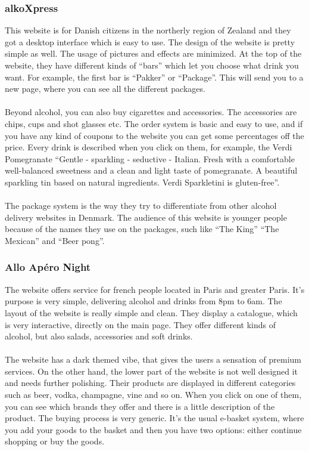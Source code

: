 \documentclass[12p]{article}
\begin{document}
\subsubsection{alkoXpress \cite{alkoXpress}}
This website is for Danish citizens in the northerly region of Zealand and they got a desktop interface which is easy to use. The design of the website is pretty simple as well. The usage of pictures and effects are minimized. At the top of the website, they have different kinds of “bars” which let you choose what drink you want. For example, the first bar is “Pakker” or “Package”. This will send you to a new page, where you can see all the different packages. 
\\ \\
Beyond alcohol, you can also buy cigarettes and accessories. The accessories are chips, cups and shot glasses etc. The order system is basic and easy to use, and if you have any kind of coupons to the website you can get some percentages off the price. 
Every drink is described when you click on them, for example, the Verdi Pomegranate 
“Gentle - sparkling - seductive - Italian.
Fresh with a comfortable well-balanced sweetness and a clean and light taste of pomegranate.
A beautiful sparkling tin based on natural ingredients.
Verdi Sparkletini is gluten-free”.
\\ \\
The package system is the way they try to differentiate from other alcohol delivery websites in Denmark. The audience of this website is younger people because of the names they use on the packages, such like “The King” “The Mexican” and “Beer pong”. 
\subsubsection{Allo Apéro Night \cite{alloAperoNight}}
The website offers service for french people located in Paris and greater Paris.
It’s purpose is very simple, delivering alcohol and drinks from 8pm to 6am.
The layout of the website is really simple and clean. They display a catalogue, which is very interactive, directly on the main page. They offer different kinds of alcohol, but also salads, accessories and soft drinks. 
\\ \\
The website has a dark themed vibe, that gives the users a sensation of premium services.
On the other hand, the lower part of the website is not well designed it and needs further polishing.
Their products are displayed in different categories such as beer, vodka, champagne, vine and so on.
When you click on one of them, you can see which brands they offer and there is a little description of the product.
The buying process is very generic. It’s the usual e-basket system, where you add your goods to the basket and then you have two options: either continue shopping or buy the goods.
\\ \\
\end{document}
